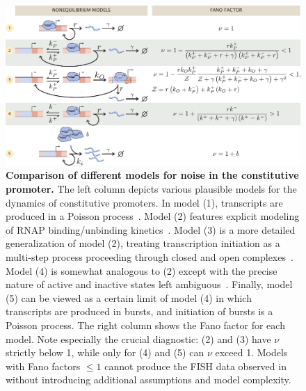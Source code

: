 \begin{figure}%
\centering
\includegraphics[width=\textwidth]{../figures/main/fig02.pdf}
\caption{\textbf{Comparison of different models for noise in the constitutive promoter.}
The left column depicts various plausible models for the dynamics of constitutive promoters.
In
model (1), transcripts are produced in a Poisson process~\cite{Jones2014}. Model
(2) features explicit modeling of RNAP binding/unbinding
kinetics~\cite{Phillips2015a}. Model (3) is a more detailed generalization of
model (2), treating transcription initiation as a multi-step process proceeding
through closed and open complexes~\cite{Mitarai2015}. Model (4) is somewhat
analogous to (2) except with the precise nature of active and inactive states
left ambiguous~\cite{Razo-Mejia2020}. Finally, model (5) can be viewed as a
certain limit of model (4) in which transcripts are produced in bursts, and
initiation of bursts is a Poisson process. 
The right column shows the
Fano factor for each model. Note especially the crucial diagnostic: (2) and (3)
have $\nu$ strictly below 1, while only for (4) and (5) can $\nu$ exceed 1.
Models with Fano factors $\le 1$ cannot produce the FISH data observed
in~\cite{Jones2014} without introducing additional assumptions and model
complexity.}
\label{fig:constit_cartoons}
\end{figure}

